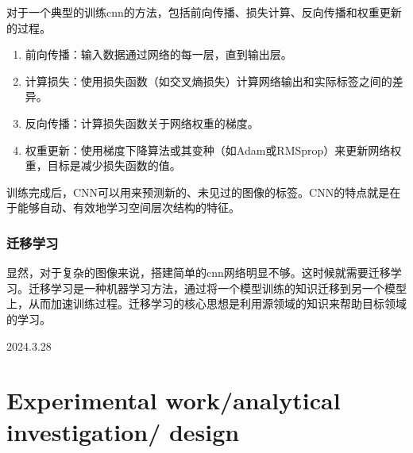 对于一个典型的训练cnn的方法，包括前向传播、损失计算、反向传播和权重更新的过程。
\begin{enumerate}
    \item 前向传播：输入数据通过网络的每一层，直到输出层。
    \item 计算损失：使用损失函数（如交叉熵损失）计算网络输出和实际标签之间的差异。
    \item 反向传播：计算损失函数关于网络权重的梯度。
    \item 权重更新：使用梯度下降算法或其变种（如Adam或RMSprop）来更新网络权重，目标是减少损失函数的值。
\end{enumerate}
训练完成后，CNN可以用来预测新的、未见过的图像的标签。CNN的特点就是在于能够自动、有效地学习空间层次结构的特征。

\subsubsection{迁移学习}

显然，对于复杂的图像来说，搭建简单的cnn网络明显不够。这时候就需要迁移学习。迁移学习是一种机器学习方法，通过将一个模型训练的知识迁移到另一个模型上，从而加速训练过程。迁移学习的核心思想是利用源领域的知识来帮助目标领域的学习。

2024.3.28


\section{Experimental work/analytical investigation/ design}



\FloatBarrier
